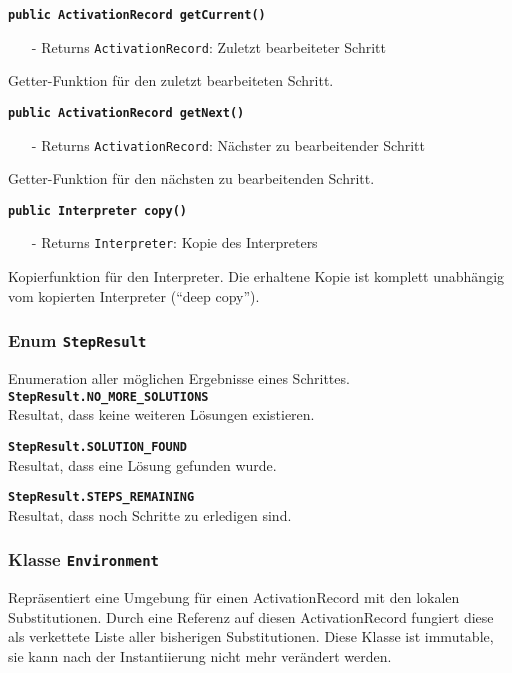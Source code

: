 \documentclass[parskip=full,11pt,twoside]{scrartcl}
\begin{document}
\textbf{\texttt{public ActivationRecord getCurrent()}}
\begin{itemize}[noitemsep]
	\item[-] Returns \texttt{ActivationRecord}: Zuletzt bearbeiteter Schritt
\end{itemize}
Getter-Funktion für den zuletzt bearbeiteten Schritt.

\textbf{\texttt{public ActivationRecord getNext()}}
\begin{itemize}[noitemsep]
	\item[-] Returns \texttt{ActivationRecord}: Nächster zu bearbeitender Schritt
\end{itemize}
Getter-Funktion für den nächsten zu bearbeitenden Schritt.

\textbf{\texttt{public Interpreter copy()}}
\begin{itemize}[noitemsep]
	\item[-] Returns \texttt{Interpreter}: Kopie des Interpreters
\end{itemize}
Kopierfunktion für den Interpreter. Die erhaltene Kopie ist komplett unabhängig vom kopierten Interpreter (\enquote{deep copy}).

\subsubsection{Enum \texttt{StepResult}}
Enumeration aller möglichen Ergebnisse eines Schrittes.\\

\textbf{\texttt{StepResult.NO\_MORE\_SOLUTIONS}}\\
Resultat, dass keine weiteren Lösungen existieren.

\textbf{\texttt{StepResult.SOLUTION\_FOUND}}\\
Resultat, dass eine Lösung gefunden wurde.

\textbf{\texttt{StepResult.STEPS\_REMAINING}}\\
Resultat, dass noch Schritte zu erledigen sind.

\subsubsection{Klasse \texttt{Environment}}
Repräsentiert eine Umgebung für einen ActivationRecord mit den lokalen Substitutionen. Durch eine Referenz auf diesen ActivationRecord fungiert diese als verkettete Liste aller bisherigen Substitutionen. Diese Klasse ist immutable, sie kann nach der Instantiierung nicht mehr verändert werden.
\end{document}

